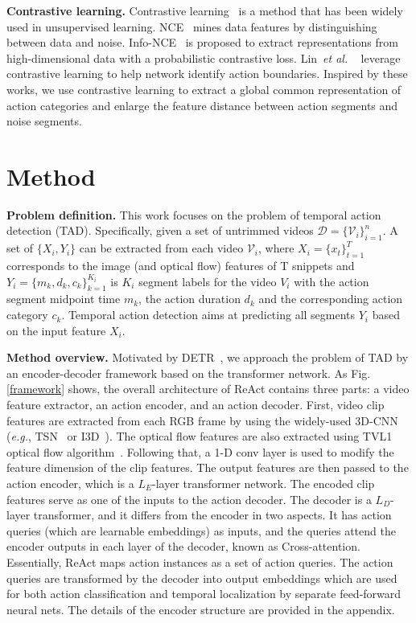 \documentclass[runningheads]{llncs}
\def\eg{{\em e.g.}}
\def\etal{{\em et al. }}
\newcommand{\figref}[1]{Fig. \ref{#1}}
\newcommand{\myPara}[1]{\vspace{.05in}\noindent\textbf{#1}}
\newcommand{\mc}[1]{\mathcal{#1}}
\def\name{ReAct }
\begin{document}
\myPara{Contrastive learning.}
Contrastive learning~\cite{chen2020simple} is a method that has been widely used in unsupervised learning. NCE~\cite{gutmann2010noise} mines data features by distinguishing between data and noise. Info-NCE~\cite{van2018representation} is proposed to extract representations from high-dimensional data with a probabilistic contrastive loss. Lin~\etal~\cite{lin2021learning} leverage contrastive learning to help network identify action boundaries. Inspired by these works, we use contrastive learning to extract a global common representation of action categories and enlarge the feature distance between action segments and noise segments. 









\section{Method}\label{sec:method}

\myPara{Problem definition.}
This work focuses on the problem of temporal action detection (TAD). Specifically, given a set of untrimmed videos $\mc{D}=\{\mc{V}_i\}_{i=1}^{n}$. A set of $\{X_i,Y_i\}$ can be extracted from each video $\mc{V}_i$, where $X_i=\{{x_t}\}_{t=1}^T$ corresponds to the image (and optical flow) features of T snippets and $Y_i=\{m_k,d_k,c_k\}_{k=1}^{K_i}$ is $K_i$ segment labels for the video $V_i$ with the action segment midpoint time $m_k$, the action duration $d_k$ and the corresponding action category $c_k$. Temporal action detection aims at predicting all segments $Y_i$ based on the input feature $X_i$. 

\myPara{Method overview.}
Motivated by DETR~\cite{carion2020end}, we approach the problem of TAD by an encoder-decoder framework based on the transformer network. 
As \figref{framework} shows, the overall architecture of \name contains three parts: a video feature extractor, an action encoder, and an action decoder.
First, video clip features are extracted from each RGB frame by using the widely-used 3D-CNN (\eg,  TSN~\cite{wang2018temporal} or I3D~\cite{carreira2017quo}). The optical flow features are also extracted using TVL1 optical flow algorithm~\cite{zach2007duality}.
Following that, a 1-D conv layer is used to modify the feature dimension of the clip features. The output features are then passed to the action encoder, which is a $L_E$-layer transformer network. The encoded clip features serve as one of the inputs to the action decoder. 
The decoder is a $L_D$-layer transformer, and it differs from the encoder in two aspects. It has action queries (which are learnable embeddings) as inputs, and the queries attend the encoder outputs in each layer of the decoder, known as Cross-attention.
Essentially, \name maps action instances as a set of action queries. The action queries are transformed by the decoder into output embeddings which are used for both action classification and temporal localization by separate feed-forward neural nets. 
The details of the encoder structure are provided in the appendix.
\end{document}
